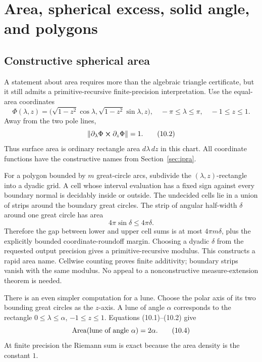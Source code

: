 \section{Area, spherical excess, solid angle, and polygons}
\label{sec:area}

\subsection{Constructive spherical area}

A statement about area requires more than the algebraic triangle certificate,
but it still admits a primitive-recursive finite-precision interpretation.
Use the equal-area coordinates
\begin{equation}
 \Phi(\lambda,z)=
 \bigl(\sqrt{1-z^2}\cos\lambda,
       \sqrt{1-z^2}\sin\lambda,z\bigr),
 \quad -\pi\le\lambda\le\pi,\quad -1\le z\le1.            \tag{10.1}
\end{equation}
Away from the two pole lines,
\begin{equation}
 \left\lVert\partial_\lambda\Phi\mathbin{\boldsymbol{\times}}\partial_z\Phi\right\rVert=1.       \tag{10.2}
\end{equation}
Thus surface area is ordinary rectangle area \(d\lambda\,dz\) in this chart.
All coordinate functions have the constructive names from Section~\ref{sec:ipra}.

For a polygon bounded by \(m\) great-circle arcs, subdivide the
\((\lambda,z)\)-rectangle into a dyadic grid.  A cell whose interval evaluation
has a fixed sign against every boundary normal is decidably inside or outside.
The undecided cells lie in a union of strips around the boundary great circles.
The strip of angular half-width \(\delta\) around one great circle has area
\begin{equation}
 4\pi\sin\delta\le4\pi\delta.                              \tag{10.3}
\end{equation}
Therefore the gap between lower and upper cell sums is at most
\(4\pi m\delta\), plus the explicitly bounded coordinate-roundoff margin.
Choosing a dyadic \(\delta\) from the requested output precision gives a
primitive-recursive modulus.  This constructs a rapid area name.  Cellwise
counting proves finite additivity; boundary strips vanish with the same
modulus.  No appeal to a nonconstructive measure-extension theorem is needed.

There is an even simpler computation for a lune.  Choose the polar axis of its
two bounding great circles as the \(z\)-axis.  A lune of angle \(\alpha\)
corresponds to the rectangle
\(0\le\lambda\le\alpha\), \(-1\le z\le1\).  Equations
(10.1)--(10.2) give
\begin{equation}
 \operatorname{Area}(\text{lune of angle }\alpha)=2\alpha.               \tag{10.4}
\end{equation}
At finite precision the Riemann sum is exact because the area density is the
constant \(1\).


